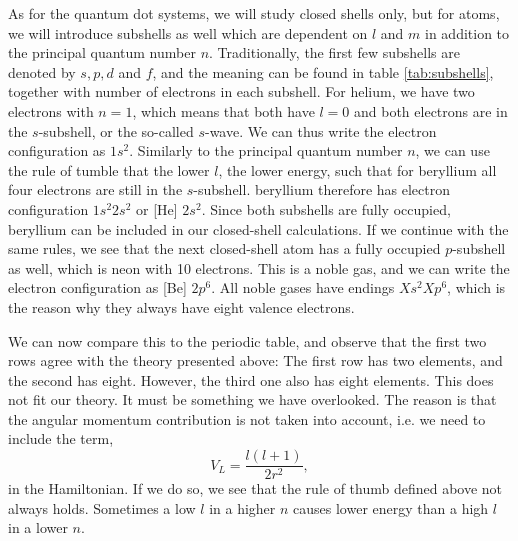As for the quantum dot systems, we will study closed shells only, but for atoms, we will introduce subshells as well which are dependent on $l$ and $m$ in addition to the principal quantum number $n$. Traditionally, the first few subshells are denoted by $s, p, d$ and $f$, and the meaning can be found in table \eqref{tab:subshells}, together with number of electrons in each subshell. For helium, we have two electrons with $n=1$, which means that both have $l=0$ and both electrons are in the $s$-subshell, or the so-called $s$-wave. We can thus write the electron configuration as $1s^2$. Similarly to the principal quantum number $n$, we can use the rule of tumble that the lower $l$, the lower energy, such that for beryllium all four electrons are still in the $s$-subshell. beryllium therefore has electron configuration $1s^2 2s^2$ or [He] $2s^2$. Since both subshells are fully occupied, beryllium can be included in our closed-shell calculations. If we continue with the same rules, we see that the next closed-shell atom has a fully occupied $p$-subshell as well, which is neon with 10 electrons. This is a noble gas, and we can write the electron configuration as [Be] $2p^6$. All noble gases have endings $Xs^2 Xp^6$, which is the reason why they always have eight valence electrons.

We can now compare this to the periodic table, and observe that the first two rows agree with the theory presented above: The first row has two elements, and the second has eight. However, the third one also has eight elements. This does not fit our theory. It must be something we have overlooked. The reason is that the angular momentum contribution is not taken into account, i.e. we need to include the term,
\begin{equation}
V_L=\frac{l(l+1)}{2r^2},
\end{equation}
in the Hamiltonian. If we do so, we see that the rule of thumb defined above not always holds. Sometimes a low $l$ in a higher $n$ causes lower energy than a high $l$ in a lower $n$.

